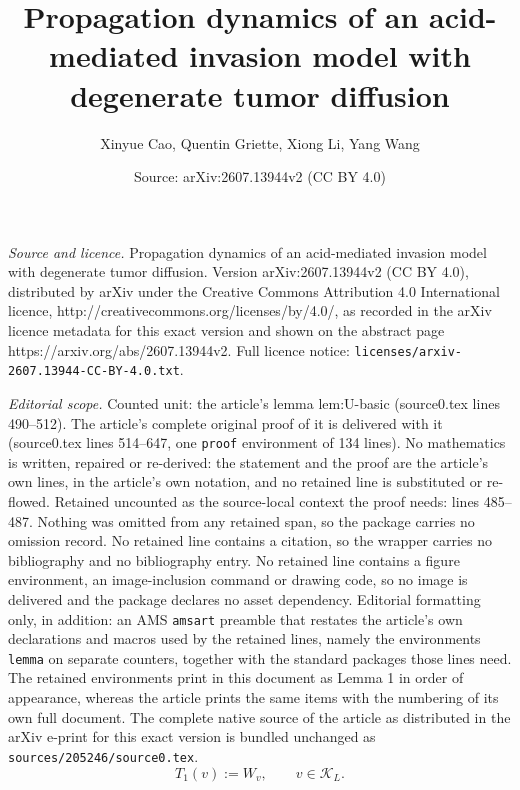 \documentclass[10pt,a4paper]{amsart}
\title{Propagation dynamics of an acid-mediated invasion model with degenerate tumor diffusion}
\author{Xinyue Cao, Quentin Griette, Xiong Li, Yang Wang}
\date{Source: arXiv:2607.13944v2 (CC BY 4.0)}
\begin{document}
\maketitle

\noindent\emph{Source and licence.} Propagation dynamics of an acid-mediated invasion model with degenerate tumor diffusion. Version arXiv:2607.13944v2 (CC BY 4.0), distributed by arXiv under the Creative Commons Attribution 4.0 International licence, http://creativecommons.org/licenses/by/4.0/, as recorded in the arXiv licence metadata for this exact version and shown on the abstract page https://arxiv.org/abs/2607.13944v2. Full licence notice: \texttt{licenses/arxiv-2607.13944-CC-BY-4.0.txt}.\par\smallskip

\noindent\textit{Editorial scope.} Counted unit: the article's lemma lem:U-basic (source0.tex lines 490--512). The article's complete original proof of it is delivered with it (source0.tex lines 514--647, one \texttt{proof} environment of 134 lines). No mathematics is written, repaired or re-derived: the statement and the proof are the article's own lines, in the article's own notation, and no retained line is substituted or re-flowed.  Retained uncounted as the source-local context the proof needs: lines 485--487.  Nothing was omitted from any retained span, so the package carries no omission record.  No retained line contains a citation, so the wrapper carries no bibliography and no bibliography entry.  No retained line contains a figure environment, an image-inclusion command or drawing code, so no image is delivered and the package declares no asset dependency.  Editorial formatting only, in addition: an AMS \texttt{amsart} preamble that restates the article's own declarations and macros used by the retained lines, namely the environments \texttt{lemma} on separate counters, together with the standard packages those lines need.  The retained environments print in this document as Lemma 1 in order of appearance, whereas the article prints the same items with the numbering of its own full document.  The complete native source of the article as distributed in the arXiv e-print for this exact version is bundled unchanged as \texttt{sources/205246/source0.tex}.
\begin{equation}\label{eq:T1-def}
T_1(v):=W_v,\qquad v\in\mathcal K_L.
\end{equation}
\end{document}
